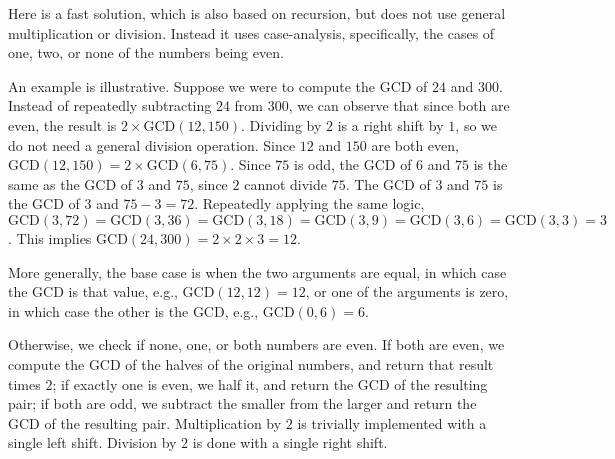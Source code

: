 \documentclass[10pt,openany,twoside,letterpaper,extrafontsizes]{memoir}
\newcommand{\myindex}[1]{%
\index[terms]{#1}%
}
\begin{document}
\begin{Spacing}{\honorsSpacing}
Here is a fast solution, which is also based on \myindex{recursion}recursion, but
does not use general multiplication or division. Instead it uses case-analysis,
specifically, the cases of one, two, or none of the numbers being even.
\myindex{case analysis}

An example is illustrative. Suppose we were to compute the GCD of
$24$ and $300$. Instead of repeatedly subtracting $24$ from $300$, we
can observe that since both are even, the result is $2\times \mbox{GCD}(12,150)$.
Dividing by $2$ is a right shift by $1$, so
we do not need a general division operation. Since $12$ and $150$ are both
even, $\mbox{GCD}(12,150)= 2\times \mbox{GCD}(6,75)$.
Since $75$ is odd, the GCD of $6$ and $75$ is the same as
the GCD of $3$ and $75$, since $2$ cannot divide $75$.
The GCD of $3$ and $75$ is the GCD of $3$ and $75-3  = 72$.
Repeatedly applying the
same logic, $\mbox{GCD}(3,72) = \mbox{GCD}(3,36) = \mbox{GCD}(3,18) = \mbox{GCD}(3,9) = \mbox{GCD}(3,6) = \mbox{GCD}(3,3) = 3$.
This implies $\mbox{GCD}(24,300) = 2 \times 2 \times 3 = 12$.

More generally, the base case is when the two arguments
are equal, in which case the GCD is
that value, e.g., $\mbox{GCD}(12,12) = 12$,
or one of the arguments is zero, in which case the other is the GCD,
e.g., $\mbox{GCD}(0,6) = 6$.

Otherwise, we check if none, one, or both numbers are even. If both
are even, we compute the \myindex{GCD}GCD of the halves of the original numbers, and return
that result times $2$; if exactly one is even, we half it, and return the \myindex{GCD}GCD of
the resulting pair; if both are odd, we subtract the smaller from the larger
and return the \myindex{GCD}GCD of the resulting pair.
Multiplication by $2$ is trivially implemented with a single left shift.
Division by $2$ is done with a single right shift.



\end{Spacing}
\end{document}
